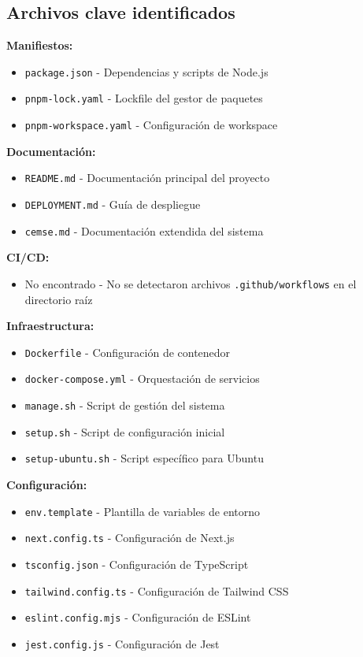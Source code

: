 \documentclass[12pt,a4paper]{article}
\begin{document}
\subsection{Archivos clave identificados}

\textbf{Manifiestos:}
\begin{itemize}
    \item \texttt{package.json} - Dependencias y scripts de Node.js
    \item \texttt{pnpm-lock.yaml} - Lockfile del gestor de paquetes
    \item \texttt{pnpm-workspace.yaml} - Configuración de workspace
\end{itemize}

\textbf{Documentación:}
\begin{itemize}
    \item \texttt{README.md} - Documentación principal del proyecto
    \item \texttt{DEPLOYMENT.md} - Guía de despliegue
    \item \texttt{cemse.md} - Documentación extendida del sistema
\end{itemize}

\textbf{CI/CD:}
\begin{itemize}
    \item No encontrado - No se detectaron archivos \texttt{.github/workflows} en el directorio raíz
\end{itemize}

\textbf{Infraestructura:}
\begin{itemize}
    \item \texttt{Dockerfile} - Configuración de contenedor
    \item \texttt{docker-compose.yml} - Orquestación de servicios
    \item \texttt{manage.sh} - Script de gestión del sistema
    \item \texttt{setup.sh} - Script de configuración inicial
    \item \texttt{setup-ubuntu.sh} - Script específico para Ubuntu
\end{itemize}

\textbf{Configuración:}
\begin{itemize}
    \item \texttt{env.template} - Plantilla de variables de entorno
    \item \texttt{next.config.ts} - Configuración de Next.js
    \item \texttt{tsconfig.json} - Configuración de TypeScript
    \item \texttt{tailwind.config.ts} - Configuración de Tailwind CSS
    \item \texttt{eslint.config.mjs} - Configuración de ESLint
    \item \texttt{jest.config.js} - Configuración de Jest
\end{itemize}
\end{document}
